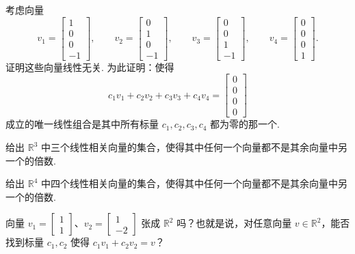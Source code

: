 \begin{question}\label{q:1-24}
考虑向量
\[
v_1=\begin{bmatrix}1\\0\\0\\-1\end{bmatrix},\qquad
v_2=\begin{bmatrix}0\\1\\0\\-1\end{bmatrix},\qquad
v_3=\begin{bmatrix}0\\0\\1\\-1\end{bmatrix},\qquad
v_4=\begin{bmatrix}0\\0\\0\\1\end{bmatrix}.
\]
证明这些向量线性无关. 为此证明：使得
\[
c_1v_1+c_2v_2+c_3v_3+c_4v_4=\begin{bmatrix}0\\0\\0\\0\end{bmatrix}
\]
成立的唯一线性组合是其中所有标量 $c_1,c_2,c_3,c_4$ 都为零的那一个.
\end{question}

\begin{question}\label{q:1-25}
给出 $\mathbb{R}^3$ 中三个线性相关向量的集合，使得其中任何一个向量都不是其余向量中另一个的倍数.
\end{question}

\begin{question}\label{q:1-26}
给出 $\mathbb{R}^4$ 中四个线性相关向量的集合，使得其中任何一个向量都不是其余向量中另一个的倍数.
\end{question}

\begin{question}\label{q:1-27}
向量 $v_1=\begin{bmatrix}1\\1\end{bmatrix}$、$v_2=\begin{bmatrix}1\\-2\end{bmatrix}$ 张成 $\mathbb{R}^2$ 吗？也就是说，对任意向量 $v\in\mathbb{R}^2$，能否找到标量 $c_1,c_2$ 使得 $c_1v_1+c_2v_2=v$？
\end{question}

